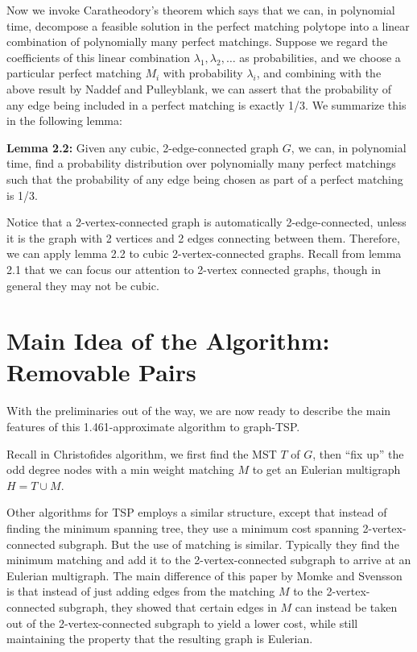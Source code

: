 \documentclass[12pt]{article}
\begin{document}
Now we invoke Caratheodory's theorem which says that we can, in polynomial time, decompose a feasible solution in the perfect matching polytope into a linear combination of polynomially many perfect matchings. Suppose we regard the coefficients of this linear combination $\lambda_1, \lambda_2,\ldots$ as probabilities, and we choose a particular perfect matching $M_i$ with probability $\lambda_i$, and combining with the above result by Naddef and Pulleyblank, we can assert that the probability of any edge being included in a perfect matching is exactly 1/3. We summarize this in the following lemma:

{\bf Lemma 2.2:} Given any cubic, 2-edge-connected graph $G$, we can, in polynomial time, find a probability distribution over polynomially many perfect matchings such that the probability of any edge being chosen as part of a perfect matching is 1/3.

Notice that a 2-vertex-connected graph is automatically 2-edge-connected, unless it is the graph with 2 vertices and 2 edges connecting between them. Therefore, we can apply lemma 2.2 to cubic 2-vertex-connected graphs. Recall from lemma 2.1 that we can focus our attention to 2-vertex connected graphs, though in general they may not be cubic.

\section{Main Idea of the Algorithm: Removable Pairs}

With the preliminaries out of the way, we are now ready to describe the main features of this 1.461-approximate algorithm to graph-TSP.

Recall in Christofides algorithm, we first find the MST $T$ of $G$, then ``fix up'' the odd degree nodes with a min weight matching $M$ to get an Eulerian multigraph $H = T\cup M$. 

Other algorithms for TSP employs a similar structure, except that instead of finding the minimum spanning tree, they use a minimum cost spanning 2-vertex-connected subgraph. But the use of matching is similar. Typically they find the minimum matching and add it to the 2-vertex-connected subgraph to arrive at an Eulerian multigraph. The main difference of this paper by Momke and Svensson is that instead of just adding edges from the matching $M$ to the 2-vertex-connected subgraph, they showed that certain edges in $M$ can instead be taken out of the 2-vertex-connected subgraph to yield a lower cost, while still maintaining the property that the resulting graph is Eulerian.
\end{document}
